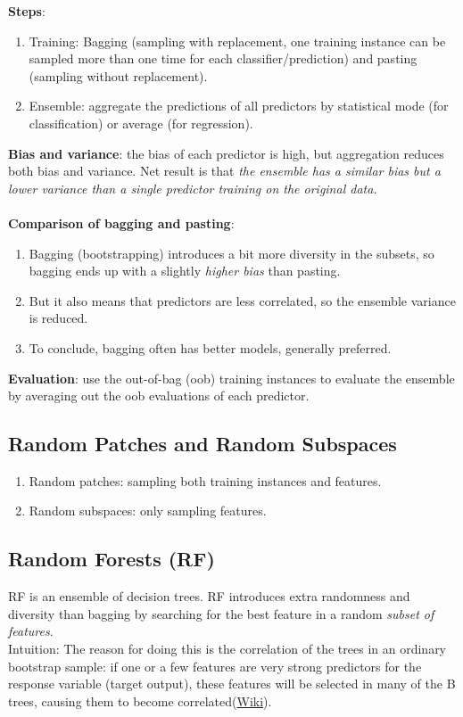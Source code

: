 \documentclass[12pt,oneside,a4paper]{article}
\numberwithin{equation}{section}
\begin{document}
\textbf{Steps}:
\begin{enumerate}
\item Training: Bagging (sampling with replacement, one training instance can be sampled more than one time for each classifier/prediction) and pasting (sampling without replacement).
\item Ensemble: aggregate the predictions of all predictors by statistical mode (for classification) or average (for regression).
\end{enumerate}

\textbf{Bias and variance}: the bias of each predictor is high, but aggregation reduces both bias and variance.  Net result is that \emph{the ensemble has a similar bias but a lower variance than a single predictor training on the original data.}\\~\\

\textbf{Comparison of bagging and pasting}:
\begin{enumerate}
\item Bagging (bootstrapping) introduces a bit more diversity in the subsets, so bagging ends up with a slightly \emph{higher bias} than pasting.

\item  But it also means that predictors are less correlated, so the ensemble variance is reduced. 
\item To conclude, bagging often has better models, generally preferred. 
\end{enumerate}

\textbf{Evaluation}: use the out-of-bag (oob) training instances to evaluate the ensemble by averaging out the oob evaluations of each predictor. 


\subsection{Random Patches and Random Subspaces}

\begin{enumerate}
\item Random patches: sampling both training instances and features. 
\item Random subspaces: only sampling features.
\end{enumerate}

\subsection{Random Forests (RF)}
RF is an ensemble of decision trees. RF introduces extra randomness and diversity than bagging by searching for the best feature in a random \emph{subset of features}. \\
Intuition: The reason for doing this is the correlation of the trees in an ordinary bootstrap sample: if one or a few features are very strong predictors for the response variable (target output), these features will be selected in many of the B trees, causing them to become correlated(\href{https://en.wikipedia.org/wiki/Random_forest#From_bagging_to_random_forests}{Wiki}). 
\end{document}
